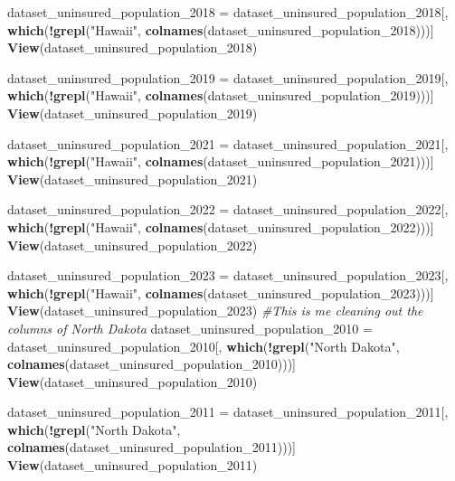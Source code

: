 \documentclass[
]{article}
\newenvironment{Shaded}{\begin{snugshade}}{\end{snugshade}}
\newcommand{\CommentTok}[1]{\textcolor[rgb]{0.56,0.35,0.01}{\textit{#1}}}
\newcommand{\FunctionTok}[1]{\textcolor[rgb]{0.13,0.29,0.53}{\textbf{#1}}}
\newcommand{\NormalTok}[1]{#1}
\newcommand{\OtherTok}[1]{\textcolor[rgb]{0.56,0.35,0.01}{#1}}
\newcommand{\SpecialCharTok}[1]{\textcolor[rgb]{0.81,0.36,0.00}{\textbf{#1}}}
\newcommand{\StringTok}[1]{\textcolor[rgb]{0.31,0.60,0.02}{#1}}
\begin{document}
\begin{Shaded}
\begin{Highlighting}[]
\NormalTok{dataset\_uninsured\_population\_2018 }\OtherTok{=}\NormalTok{ dataset\_uninsured\_population\_2018[, }\FunctionTok{which}\NormalTok{(}\SpecialCharTok{!}\FunctionTok{grepl}\NormalTok{(}\StringTok{"Hawaii"}\NormalTok{, }\FunctionTok{colnames}\NormalTok{(dataset\_uninsured\_population\_2018)))]}
\FunctionTok{View}\NormalTok{(dataset\_uninsured\_population\_2018)}

\NormalTok{dataset\_uninsured\_population\_2019 }\OtherTok{=}\NormalTok{ dataset\_uninsured\_population\_2019[, }\FunctionTok{which}\NormalTok{(}\SpecialCharTok{!}\FunctionTok{grepl}\NormalTok{(}\StringTok{"Hawaii"}\NormalTok{, }\FunctionTok{colnames}\NormalTok{(dataset\_uninsured\_population\_2019)))]}
\FunctionTok{View}\NormalTok{(dataset\_uninsured\_population\_2019)}

\NormalTok{dataset\_uninsured\_population\_2021 }\OtherTok{=}\NormalTok{ dataset\_uninsured\_population\_2021[, }\FunctionTok{which}\NormalTok{(}\SpecialCharTok{!}\FunctionTok{grepl}\NormalTok{(}\StringTok{"Hawaii"}\NormalTok{, }\FunctionTok{colnames}\NormalTok{(dataset\_uninsured\_population\_2021)))]}
\FunctionTok{View}\NormalTok{(dataset\_uninsured\_population\_2021)}

\NormalTok{dataset\_uninsured\_population\_2022 }\OtherTok{=}\NormalTok{ dataset\_uninsured\_population\_2022[, }\FunctionTok{which}\NormalTok{(}\SpecialCharTok{!}\FunctionTok{grepl}\NormalTok{(}\StringTok{"Hawaii"}\NormalTok{, }\FunctionTok{colnames}\NormalTok{(dataset\_uninsured\_population\_2022)))]}
\FunctionTok{View}\NormalTok{(dataset\_uninsured\_population\_2022)}

\NormalTok{dataset\_uninsured\_population\_2023 }\OtherTok{=}\NormalTok{ dataset\_uninsured\_population\_2023[, }\FunctionTok{which}\NormalTok{(}\SpecialCharTok{!}\FunctionTok{grepl}\NormalTok{(}\StringTok{"Hawaii"}\NormalTok{, }\FunctionTok{colnames}\NormalTok{(dataset\_uninsured\_population\_2023)))]}
\FunctionTok{View}\NormalTok{(dataset\_uninsured\_population\_2023)}
\CommentTok{\#This is me cleaning out the columns of North Dakota}
\NormalTok{dataset\_uninsured\_population\_2010 }\OtherTok{=}\NormalTok{ dataset\_uninsured\_population\_2010[, }\FunctionTok{which}\NormalTok{(}\SpecialCharTok{!}\FunctionTok{grepl}\NormalTok{(}\StringTok{"North Dakota"}\NormalTok{, }\FunctionTok{colnames}\NormalTok{(dataset\_uninsured\_population\_2010)))]}
\FunctionTok{View}\NormalTok{(dataset\_uninsured\_population\_2010)}

\NormalTok{dataset\_uninsured\_population\_2011 }\OtherTok{=}\NormalTok{ dataset\_uninsured\_population\_2011[, }\FunctionTok{which}\NormalTok{(}\SpecialCharTok{!}\FunctionTok{grepl}\NormalTok{(}\StringTok{"North Dakota"}\NormalTok{, }\FunctionTok{colnames}\NormalTok{(dataset\_uninsured\_population\_2011)))]}
\FunctionTok{View}\NormalTok{(dataset\_uninsured\_population\_2011)}


\end{Highlighting}
\end{Shaded}
\end{document}
